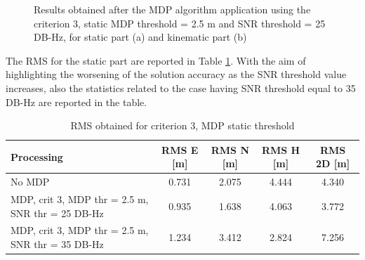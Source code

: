 \begin{figure}[H] 
	\centering
    \caption{Results obtained after the MDP algorithm application using the criterion 3, static MDP threshold = 2.5 m and SNR threshold = 25 DB-Hz, for static part (a) and kinematic part (b)}
	\label{FIG:test3mdp_crit3m25s25} 
\end{figure}

The RMS for the static part are reported in Table \ref{tab:test3mpd_crit3_mdp_static}. With the aim of highlighting the worsening of the solution accuracy as the SNR threshold value increases, also the statistics related to the case having SNR threshold equal to 35 DB-Hz are reported in the table.

\begin{table}[H]
	\centering
	\begin{tabular}{|p{4.5cm}|c|c|c|c|}
	\hline
	\textbf{Processing} & \textbf{RMS E [m]} & \textbf{RMS N [m]} &
	\textbf{RMS H [m]}&
	\textbf{RMS 2D [m]}\\
    \hline
	No MDP & 0.731 & 2.075& 4.444&4.340\\  
    \hline
	 MDP, crit 3, MDP thr = 2.5 m, SNR thr = 25 DB-Hz& 0.935 &1.638&4.063&3.772\\ \hline
	 MDP, crit 3, MDP thr = 2.5 m, SNR thr = 35 DB-Hz&1.234 &3.412&2.824&7.256\\ \hline
	\end{tabular} 
	\caption{RMS obtained for criterion 3, MDP static threshold}
	\label{tab:test3mpd_crit3_mdp_static}
\end{table}

